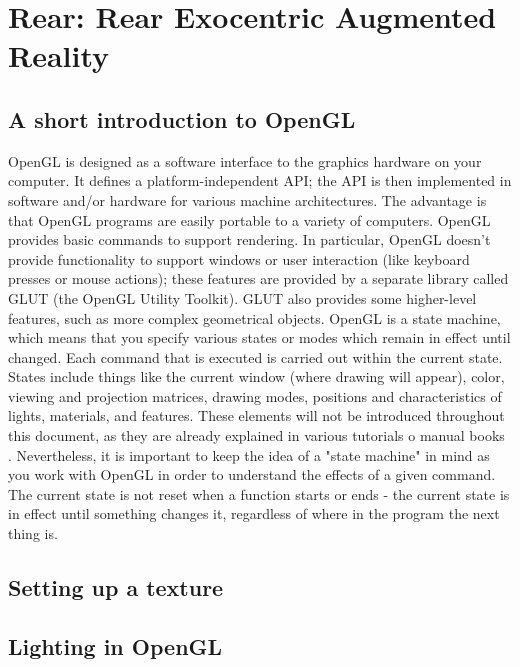 \section{Rear: Rear Exocentric Augmented Reality}
\label{sec:rear}

\subsection{A short introduction to OpenGL}

OpenGL is designed as a software interface to the graphics hardware on your computer. It defines a platform-independent API;
the API is then implemented in software and/or hardware for various machine architectures. The advantage is that OpenGL programs
are easily portable to a variety of computers.
\newline OpenGL provides basic commands to support rendering. In particular, OpenGL doesn't provide functionality to support
windows or user interaction (like keyboard presses or mouse actions); these features are provided by a separate library called
GLUT (the OpenGL Utility Toolkit). GLUT also provides some higher-level features, such as more complex geometrical objects.
\newline OpenGL is a state machine, which means that you specify various states or modes which remain in effect until changed.
Each command that is executed is carried out within the current state. States include things like the current window (where
drawing will appear), color, viewing and projection matrices, drawing modes, positions and characteristics of lights,
materials, and features. These elements will not be introduced throughout this document, as they are already explained in
various tutorials \cite{opengl:brieftutorial} o manual books \cite{opengl:redbook}.
\newline Nevertheless, it is important to keep the idea of a "state machine" in mind as you work with OpenGL in order to 
understand the effects of a given command. The current state is not reset when a function starts or ends - the current state
is in effect until something changes it, regardless of where in the program the next thing is. 

\subsection{Setting up a texture}
\subsection{Lighting in OpenGL}
